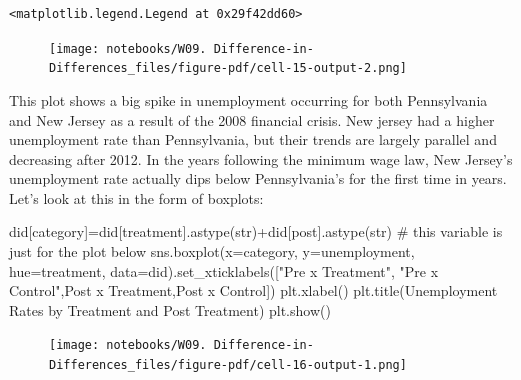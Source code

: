 \documentclass[
  letterpaper,
  DIV=11,
  numbers=noendperiod]{scrreprt}
\newenvironment{Shaded}{\begin{snugshade}}{\end{snugshade}}
\newcommand{\BuiltInTok}[1]{\textcolor[rgb]{0.00,0.23,0.31}{#1}}
\newcommand{\CommentTok}[1]{\textcolor[rgb]{0.37,0.37,0.37}{#1}}
\newcommand{\NormalTok}[1]{\textcolor[rgb]{0.00,0.23,0.31}{#1}}
\newcommand{\OperatorTok}[1]{\textcolor[rgb]{0.37,0.37,0.37}{#1}}
\newcommand{\StringTok}[1]{\textcolor[rgb]{0.13,0.47,0.30}{#1}}
\begin{document}
\begin{verbatim}
<matplotlib.legend.Legend at 0x29f42dd60>
\end{verbatim}

\begin{figure}[H]

{\centering \texttt{[image: notebooks/W09. Difference-in-Differences\_files/figure-pdf/cell-15-output-2.png]}

}

\end{figure}

This plot shows a big spike in unemployment occurring for both
Pennsylvania and New Jersey as a result of the 2008 financial crisis.
New jersey had a higher unemployment rate than Pennsylvania, but their
trends are largely parallel and decreasing after 2012. In the years
following the minimum wage law, New Jersey's unemployment rate actually
dips below Pennsylvania's for the first time in years. Let's look at
this in the form of boxplots:

\begin{Shaded}
\begin{Highlighting}[]
\NormalTok{did[}\StringTok{\textquotesingle{}category\textquotesingle{}}\NormalTok{]}\OperatorTok{=}\NormalTok{did[}\StringTok{\textquotesingle{}treatment\textquotesingle{}}\NormalTok{].astype(}\BuiltInTok{str}\NormalTok{)}\OperatorTok{+}\NormalTok{did[}\StringTok{\textquotesingle{}post\textquotesingle{}}\NormalTok{].astype(}\BuiltInTok{str}\NormalTok{) }\CommentTok{\# this variable is just for the plot below}
\NormalTok{sns.boxplot(x}\OperatorTok{=}\StringTok{\textquotesingle{}category\textquotesingle{}}\NormalTok{, y}\OperatorTok{=}\StringTok{\textquotesingle{}unemployment\textquotesingle{}}\NormalTok{, hue}\OperatorTok{=}\StringTok{\textquotesingle{}treatment\textquotesingle{}}\NormalTok{, data}\OperatorTok{=}\NormalTok{did).set\_xticklabels([}\StringTok{"Pre x Treatment"}\NormalTok{, }\StringTok{"Pre x Control"}\NormalTok{,}\StringTok{\textquotesingle{}Post x Treatment\textquotesingle{}}\NormalTok{,}\StringTok{\textquotesingle{}Post x Control\textquotesingle{}}\NormalTok{]) }
\NormalTok{plt.xlabel(}\StringTok{\textquotesingle{}\textquotesingle{}}\NormalTok{)}
\NormalTok{plt.title(}\StringTok{\textquotesingle{}Unemployment Rates by Treatment and Post Treatment\textquotesingle{}}\NormalTok{)}
\NormalTok{plt.show()}
\end{Highlighting}
\end{Shaded}

\begin{figure}[H]

{\centering \texttt{[image: notebooks/W09. Difference-in-Differences\_files/figure-pdf/cell-16-output-1.png]}

}

\end{figure}
\end{document}

